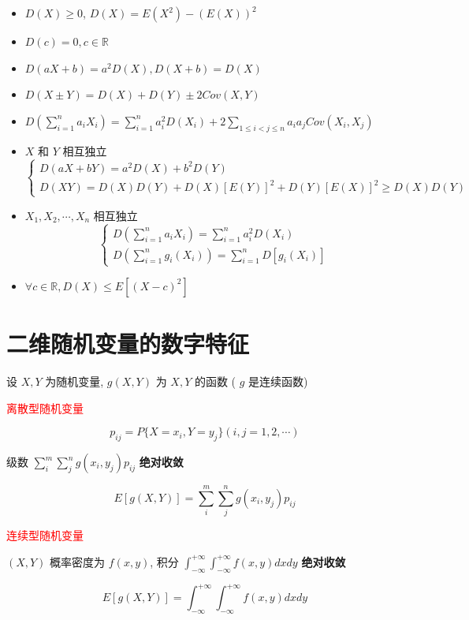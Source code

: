 \begin{corollary}[方差和标准差推论]
	\begin{itemize}
		\item $D(X)\geq 0$, $D(X) = E(X^2) - (E(X))^{2}$
		\item $D(c)=0, c\in \mathbb{R}$
		\item $D(aX + b) = a^{2}D(X), D(X + b) = D(X)$ 
		\item $D(X\pm Y) = D(X) + D(Y) \pm 2Cov(X,Y)$
		\item $D\left(\sum\limits_{i = 1}^{n}a_{i}X_{i}\right) = \sum\limits_{i = 1}^{n}a_{i}^{2}D(X_{i}) + 2 \sum\limits_{1 \leq i < j\leq n}a_{i}a_{j} Cov(X_{i},X_{j})$
		\item $X$ 和 $Y$ 相互独立 
		$$\begin{cases}
			D(aX + bY) = a^{2}D(X) + b^{2}D(Y)\\
			D(XY) = D(X)D(Y) + D(X)[E(Y)]^{2} + D(Y)[E(X)]^{2}\geq D(X)D(Y)
		\end{cases}$$
		\item $X_{1}, X_{2}, \cdots,X_{n}$ 相互独立 
		$$\begin{cases}
			D\left(\sum\limits_{i = 1}^{n}a_{i}X_{i}\right) = \sum\limits_{i = 1}^{n}a_{i}^{2}D(X_{i})\\
			D\left(\sum\limits_{i = 1}^{n}g_{i}(X_{i})\right) = \sum\limits_{i = 1}^{n}D\left[g_{i}(X_{i})\right]
		\end{cases}$$
		\item $\forall c\in \mathbb{R}, D(X) \leq E\left[(X-c)^{2}\right]$
	\end{itemize}
\end{corollary}


\section{二维随机变量的数字特征}

\begin{definition}[数学期望]
设 $X,Y$ 为随机变量, $g(X,Y)$ 为 $X,Y$ 的函数 ( $g$ 是连续函数)

\textcolor{red}{离散型随机变量}

	$$p_{ij} = P\{X = x_{i},Y = y_{j}\}(i,j = 1,2,\cdots)$$

	级数 $\sum\limits_{i}^{m}\sum\limits_{j}^{n}g(x_{i},y_{j})p_{ij}$ \textbf{绝对收敛} 

	$$E[g(X,Y)] = \sum\limits_{i}^{m}\sum\limits_{j}^{n} g(x_{i},y_{j})p_{ij}$$

\textcolor{red}{连续型随机变量}

	$(X,Y)$ 概率密度为 $f(x,y)$, 积分 $\int_{-\infty}^{+\infty}\int_{-\infty}^{+\infty}f(x,y)dxdy$ \textbf{绝对收敛}

	$$E[g(X,Y)] = \int_{-\infty}^{+\infty}\int_{-\infty}^{+\infty}f(x,y)dxdy$$
\end{definition}


